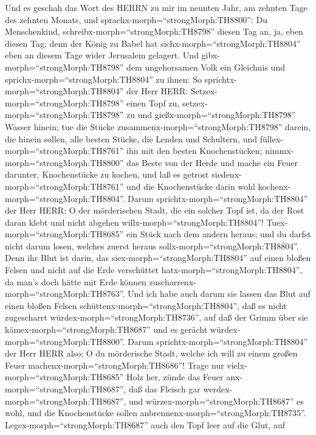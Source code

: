  Und es geschah das Wort des HERRN zu mir im neunten Jahr,
am zehnten Tage des zehnten Monats, und
sprachx-morph=``strongMorph:TH8800'':  Du Menschenkind,
schreibx-morph=``strongMorph:TH8798'' diesen Tag an, ja, eben diesen
Tag; denn der König zu Babel hat sichx-morph=``strongMorph:TH8804'' eben
an diesem Tage wider Jerusalem gelagert.  Und
gibx-morph=``strongMorph:TH8798'' dem ungehorsamen Volk ein Gleichnis
und sprichx-morph=``strongMorph:TH8804'' zu ihnen: So
sprichtx-morph=``strongMorph:TH8804'' der Herr HERR:
Setzex-morph=``strongMorph:TH8798'' einen Topf zu,
setzex-morph=``strongMorph:TH8798'' zu und
gießx-morph=``strongMorph:TH8798'' Wasser hinein;  tue die
Stücke zusammenx-morph=``strongMorph:TH8798'' darein, die hinein sollen,
alle besten Stücke, die Lenden und Schultern, und
füllex-morph=``strongMorph:TH8761'' ihn mit den besten Knochenstücken;
 nimmx-morph=``strongMorph:TH8800'' das Beste von der Herde
und mache ein Feuer darunter, Knochenstücke zu kochen, und laß es
getrost siedenx-morph=``strongMorph:TH8761'' und die Knochenstücke darin
wohl kochenx-morph=``strongMorph:TH8804''.  Darum
sprichtx-morph=``strongMorph:TH8804'' der Herr HERR: O der mörderischen
Stadt, die ein solcher Topf ist, da der Rost daran klebt und nicht
abgehen willx-morph=``strongMorph:TH8804''!
Tuex-morph=``strongMorph:TH8685'' ein Stück nach dem andern heraus; und
du darfst nicht darum losen, welches zuerst heraus
sollx-morph=``strongMorph:TH8804''.  Denn ihr Blut ist
darin, das siex-morph=``strongMorph:TH8804'' auf einen bloßen Felsen und
nicht auf die Erde verschüttet hatx-morph=``strongMorph:TH8804'', da
man's doch hätte mit Erde können
zuscharrenx-morph=``strongMorph:TH8763''.  Und ich habe auch
darum sie lassen das Blut auf einen bloßen Felsen
schüttenx-morph=``strongMorph:TH8804'', daß es nicht zugescharrt
würdex-morph=``strongMorph:TH8736'', auf daß der Grimm über sie
kämex-morph=``strongMorph:TH8687'' und es gerächt
würdex-morph=``strongMorph:TH8800''.  Darum
sprichtx-morph=``strongMorph:TH8804'' der Herr HERR also: O du
mörderische Stadt, welche ich will zu einem großen Feuer
machenx-morph=``strongMorph:TH8686''!  Trage nur
vielx-morph=``strongMorph:TH8685'' Holz her, zünde das Feuer
anx-morph=``strongMorph:TH8687'', daß das Fleisch gar
werdex-morph=``strongMorph:TH8687'', und
würzex-morph=``strongMorph:TH8687'' es wohl, und die Knochenstücke
sollen anbrennenx-morph=``strongMorph:TH8735''. 
Legex-morph=``strongMorph:TH8687'' auch den Topf leer auf die Glut, auf
